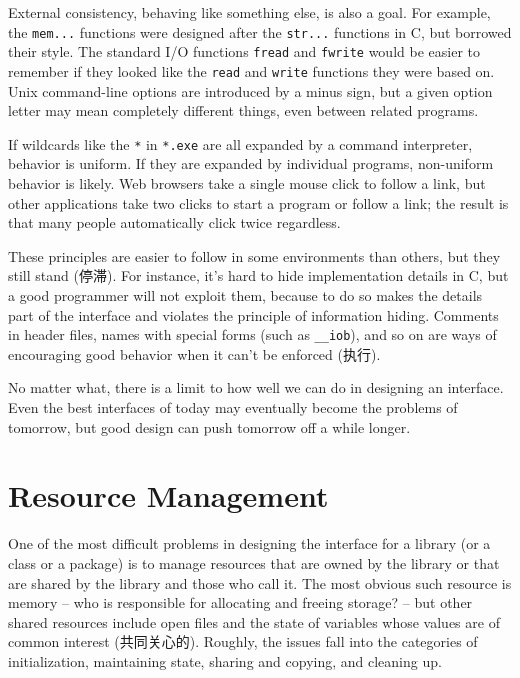 External consistency, behaving like something else, is also a goal. For
example, the \verb'mem...' functions were designed after the \verb'str...'
functions in C, but borrowed their style. The standard I/O functions
\verb'fread' and \verb'fwrite' would be easier to remember if they looked
like the \verb'read' and \verb'write' functions they were based on. Unix
command-line options are introduced by a minus sign, but a given option
letter may mean completely different things, even between related programs.

If wildcards like the \verb'*' in \verb'*.exe' are all expanded by a
command interpreter, behavior is uniform. If they are expanded by
individual programs, non-uniform behavior is likely. Web browsers take a
single mouse click to follow a link, but other applications take two clicks
to start a program or follow a link; the result is that many people
automatically click twice regardless.

These principles are easier to follow in some environments than others, but
they still stand (停滞). For instance, it's hard to hide implementation
details in C, but a good programmer will not exploit them, because to do so
makes the details part of the interface and violates the principle of
information hiding. Comments in header files, names with special forms
(such as \verb'__iob'), and so on are ways of encouraging good behavior
when it can't be enforced (执行).

No matter what, there is a limit to how well we can do in designing an
interface.  Even the best interfaces of today may eventually become the
problems of tomorrow, but good design can push tomorrow off a while longer.

\section{Resource Management}
\label{sec:resource_management}

One of the most difficult problems in designing the interface for a library
(or a class or a package) is to manage resources that are owned by the
library or that are shared by the library and those who call it. The most
obvious such resource is memory -- who is responsible for allocating and
freeing storage? -- but other shared resources include open files and the
state of variables whose values are of common interest (共同关心的).
Roughly, the issues fall into the categories of initialization, maintaining
state, sharing and copying, and cleaning up.

